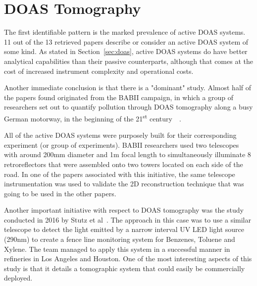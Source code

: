 \section{DOAS Tomography}%
\label{sec:doas_tomography}






The first identifiable pattern is the marked prevalence of active
\gls{DOAS} systems. 11 out of the 13 retrieved papers describe or
consider an active \gls{DOAS} system of some kind. As stated in
Section~\ref{sec:doas}, active \gls{DOAS} systems do have better
analytical capabilities than their passive counterparts, although that
comes at the cost of increased instrument complexity and operational
costs. 

Another immediate conclusion is that there is a "dominant" study. Almost
half of the papers found originated from the BABII campaign, in which a
group of researchers set out to quantify pollution through \gls{DOAS}
tomography along a busy German motorway, in the beginning of the
21\textsuperscript{st} century~\cite{Pundt2005,
Laepple2004}~.

All of the active \gls{DOAS} systems were purposely built for their
corresponding experiment (or group of experiments). BABII researchers
used two telescopes with around 200mm diameter and 1m focal length to
simultaneously illuminate 8 retroreflectors that were assembled onto two
towers located on each side of the road. In one of the papers associated
with this initiative, the same telescope instrumentation was used to
validate the 2D reconstruction technique that was going to be used in
the other papers.

Another important initiative with respect to \gls{DOAS} tomography was
the study conducted in 2016 by Stutz et al~\cite{Stutz2016}. The
approach in this case was to use a similar telescope to detect the light
emitted by a narrow interval UV LED light source (290nm) to create a
fence line monitoring system for Benzenes, Toluene and Xylene. The team
managed to apply this system in a successful manner in refineries in Los
Angeles and Houston. One of the most interesting aspects of this study
is that it details a tomographic system that could easily be
commercially deployed.

